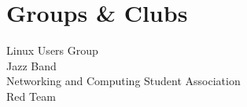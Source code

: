 \documentclass[]{deedy-resume-reversed}
\begin{document}
\begin{minipage}[t]{0.39\textwidth}




\sectionsep


\section{Groups \& Clubs}
Linux Users Group \\
Jazz Band \\
Networking and Computing Student Association \\
Red Team \\


\end{minipage}
\end{document}
